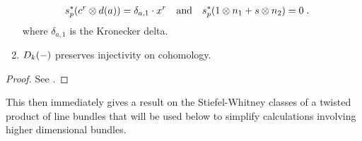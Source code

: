\begin{Thm}
\begin{enumerate}
    \begin{align}\label{eq:twistedprodcohom:section}
      {s}^*_p(c^r\otimes d(a)) &= \delta_{a,1} \cdot x^r
      &\text{and}&
      &{s}^*_p(1\otimes n_1 + s\otimes n_2) &= 0
      \;.
    \end{align}
    where $\delta_{a,1}$ is the Kronecker delta.
  \item\label{item:twistedprod:preservescohominj}
    $D_{k}({-})$ preserves injectivity on cohomology.
  \end{enumerate}
  \begin{proof}
    See \cite[Theorem~7.1]{brown}.
  \end{proof}
\end{Thm}

This then immediately gives a result on the Stiefel-Whitney classes of
a twisted product of line bundles that will be used below to simplify
calculations involving higher dimensional bundles.
